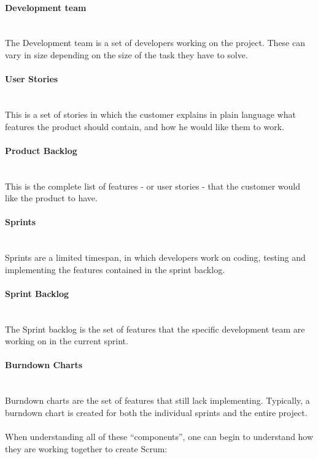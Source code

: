 \paragraph{Development team}\\
The Development team is a set of developers working on the project. These can vary in size depending on the size of the task they have to solve.

\paragraph{User Stories}\\
This is a set of stories in which the customer explains in plain language what features the product should contain, and how he would like them to work.

\paragraph{Product Backlog}\\
This is the complete list of features - or user stories - that the customer would like the product to have.

\paragraph{Sprints}\\
Sprints are a limited timespan, in which developers work on coding, testing and implementing the features contained in the sprint backlog.

\paragraph{Sprint Backlog}\\
The Sprint backlog is the set of features that the specific development team are working on in the current sprint.

\paragraph{Burndown Charts}\\
Burndown charts are the set of features that still lack implementing. Typically, a burndown chart is created for both the individual sprints and the entire project.\\
\\
When understanding all of these ``components'', one can begin to understand how they are working together to create Scrum:

